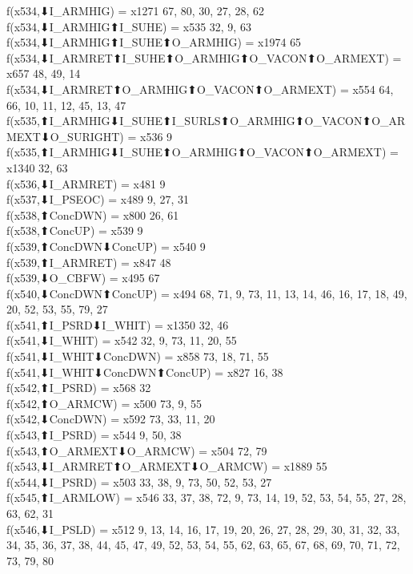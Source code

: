 f(x534,⬇I_ARMHIG) = x1271 {67, 80, 30, 27, 28, 62} \\
f(x534,⬇I_ARMHIG⬆I_SUHE) = x535 {32, 9, 63} \\
f(x534,⬇I_ARMHIG⬆I_SUHE⬆O_ARMHIG) = x1974 {65} \\
f(x534,⬇I_ARMRET⬆I_SUHE⬆O_ARMHIG⬆O_VACON⬆O_ARMEXT) = x657 {48, 49, 14} \\
f(x534,⬇I_ARMRET⬆O_ARMHIG⬆O_VACON⬆O_ARMEXT) = x554 {64, 66, 10, 11, 12, 45, 13, 47} \\
f(x535,⬆I_ARMHIG⬇I_SUHE⬆I_SURLS⬆O_ARMHIG⬆O_VACON⬆O_ARMEXT⬇O_SURIGHT) = x536 {9} \\
f(x535,⬆I_ARMHIG⬇I_SUHE⬆O_ARMHIG⬆O_VACON⬆O_ARMEXT) = x1340 {32, 63} \\
f(x536,⬇I_ARMRET) = x481 {9} \\
f(x537,⬇I_PSEOC) = x489 {9, 27, 31} \\
f(x538,⬆ConcDWN) = x800 {26, 61} \\
f(x538,⬆ConcUP) = x539 {9} \\
f(x539,⬆ConcDWN⬇ConcUP) = x540 {9} \\
f(x539,⬆I_ARMRET) = x847 {48} \\
f(x539,⬇O_CBFW) = x495 {67} \\
f(x540,⬇ConcDWN⬆ConcUP) = x494 {68, 71, 9, 73, 11, 13, 14, 46, 16, 17, 18, 49, 20, 52, 53, 55, 79, 27} \\
f(x541,⬆I_PSRD⬇I_WHIT) = x1350 {32, 46} \\
f(x541,⬇I_WHIT) = x542 {32, 9, 73, 11, 20, 55} \\
f(x541,⬇I_WHIT⬇ConcDWN) = x858 {73, 18, 71, 55} \\
f(x541,⬇I_WHIT⬇ConcDWN⬆ConcUP) = x827 {16, 38} \\
f(x542,⬆I_PSRD) = x568 {32} \\
f(x542,⬆O_ARMCW) = x500 {73, 9, 55} \\
f(x542,⬇ConcDWN) = x592 {73, 33, 11, 20} \\
f(x543,⬆I_PSRD) = x544 {9, 50, 38} \\
f(x543,⬆O_ARMEXT⬇O_ARMCW) = x504 {72, 79} \\
f(x543,⬇I_ARMRET⬆O_ARMEXT⬇O_ARMCW) = x1889 {55} \\
f(x544,⬇I_PSRD) = x503 {33, 38, 9, 73, 50, 52, 53, 27} \\
f(x545,⬆I_ARMLOW) = x546 {33, 37, 38, 72, 9, 73, 14, 19, 52, 53, 54, 55, 27, 28, 63, 62, 31} \\
f(x546,⬇I_PSLD) = x512 {9, 13, 14, 16, 17, 19, 20, 26, 27, 28, 29, 30, 31, 32, 33, 34, 35, 36, 37, 38, 44, 45, 47, 49, 52, 53, 54, 55, 62, 63, 65, 67, 68, 69, 70, 71, 72, 73, 79, 80} \\
